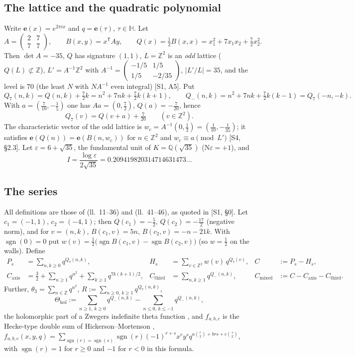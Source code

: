 \documentclass[11pt]{article}
\theoremstyle{definition}
\newcommand{\Q}{\mathbb{Q}}
\newcommand{\Z}{\mathbb{Z}}
\newcommand{\Hb}{\mathbb{H}}
\newcommand{\e}{\mathbf{e}}
\newcommand{\sgn}{\operatorname{sgn}}
\newcommand{\Thol}{\Theta_{\mathrm{hol}}}
\newcommand{\Cthird}{C_{\mathrm{third}}}
\newcommand{\Caxis}{C_{\mathrm{axis}}}
\newcommand{\Cmixed}{C_{\mathrm{mixed}}}
\newcommand{\Nm}{\mathrm{N}}
\newcommand{\src}[1]{\textup{[S#1]}}
\begin{document}
\subsection{The lattice and the quadratic polynomial}
Write $\e(x)=e^{2\pi i x}$ and $q=\e(\tau)$, $\tau\in\Hb$. Let
\[
A=\begin{pmatrix}2&7\\7&7\end{pmatrix},\qquad B(x,y)=x^{\mathsf T}Ay,\qquad
Q(x)=\tfrac12B(x,x)=x_1^2+7x_1x_2+\tfrac72x_2^2 .
\]
Then $\det A=-35$, $Q$ has signature $(1,1)$, $L=\Z^2$ is an \emph{odd} lattice ($Q(L)\not\subset\Z$),
$L'=A^{-1}\Z^2$ with $A^{-1}=\begin{pmatrix}-1/5&1/5\\1/5&-2/35\end{pmatrix}$, $|L'/L|=35$, and the level is
$70$ (the least $N$ with $NA^{-1}$ even integral) \src{1, A5}. Put
\[
Q_7(n,k)=Q(n,k)+\tfrac72k=n^2+7nk+\tfrac72k(k+1),\qquad
Q_-(n,k)=n^2+7nk+\tfrac72k(k-1)=Q_7(-n,-k).
\]
With $a=(\tfrac7{10},-\tfrac15)$ one has $Aa=(0,\tfrac72)$, $Q(a)=-\tfrac7{20}$, hence
\begin{equation}\label{eq:shift}
Q_7(v)=Q(v+a)+\tfrac{7}{20}\qquad(v\in\Z^2).
\end{equation}
The characteristic vector of the odd lattice is $w_c=A^{-1}(0,\tfrac12)=(\tfrac1{10},-\tfrac1{35})$; it satisfies
$\e(Q(n))=\e(B(n,w_c))$ for $n\in\Z^2$ and $w_c\equiv a\pmod{L'}$ \src{4, \S2.3}.
Let $\varepsilon=6+\sqrt{35}$, the fundamental unit of $K=\Q(\sqrt{35})$ ($\Nm\varepsilon=+1$), and
\[
I=\frac{\log\varepsilon}{2\sqrt{35}}=0.209419820314714631473\ldots
\]

\subsection{The series}
All definitions are those of  (ll.~11--36) and
 (ll.~41--46), as quoted in \src{1, \S0}.
Let $c_1=(-1,1)$, $c_2=(-4,1)$; then $Q(c_1)=-\tfrac52$, $Q(c_2)=-\tfrac{17}2$ (negative norm), and for
$v=(n,k)$, $B(c_1,v)=5n$, $B(c_2,v)=-n-21k$. With $\sgn(0)=0$ put
$w(v)=\tfrac12\bigl(\sgn B(c_1,v)-\sgn B(c_2,v)\bigr)$ (so $w=\tfrac12$ on the walls). Define
\begin{align*}
P_s&=\sum_{n,k\ge0}q^{Q_7(n,k)}, &
H_s&=\sum_{v\in\Z^2}w(v)\,q^{Q_7(v)}, &
C&:=P_s-H_s,\\
\Caxis&=\tfrac32+\sum_{n\ge1}q^{n^2}+\sum_{k\ge1}q^{7k(k+1)/2}, &
\Cthird&=\sum_{n,k\ge1}q^{Q_-(n,k)}, &
\Cmixed&:=C-\Caxis-\Cthird.
\end{align*}
Further, $\theta_3=\sum_{n\in\Z}q^{n^2}$, $R:=\sum_{n\ge0,\,k\ge1}q^{Q_7(n,k)}$,
\[
\Thol:=\sum_{n\ge1,\,k\ge0}q^{Q_-(n,k)}-\sum_{n\le0,\,k\le-1}q^{Q_-(n,k)},
\]
the holomorphic part of a Zwegers indefinite theta function \cite{Zw}, and $f_{a,b,c}$ is the
Hecke-type double sum of Hickerson--Mortenson \cite[Def.~0.2]{HM},
$f_{a,b,c}(x,y,q)=\sum_{\sgn(r)=\sgn(s)}\sgn(r)(-1)^{r+s}x^ry^sq^{a\binom r2+brs+c\binom s2}$, with
$\sgn(r)=1$ for $r\ge0$ and $-1$ for $r<0$ in this formula.
\end{document}
